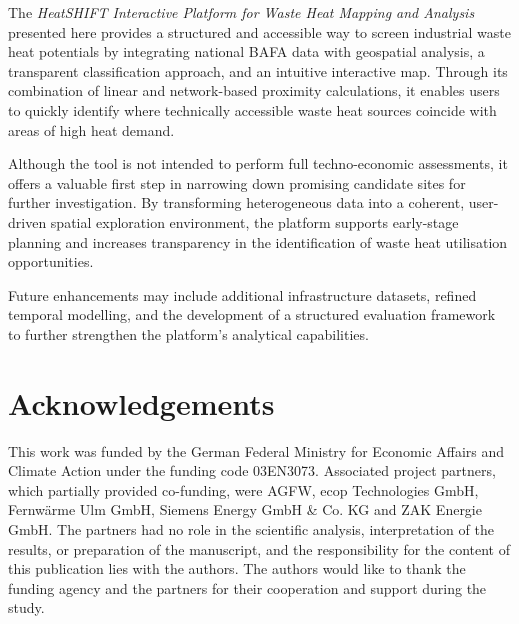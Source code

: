 \documentclass[letterpaper,11pt]{article}
\begin{document}
The \textit{HeatSHIFT Interactive Platform for Waste Heat Mapping and Analysis} presented here provides a structured and accessible way to screen industrial waste heat potentials by integrating national BAFA data with geospatial analysis, a transparent classification approach, and an intuitive interactive map. Through its combination of linear and network-based proximity calculations, it enables users to quickly identify where technically accessible waste heat sources coincide with areas of high heat demand.

Although the tool is not intended to perform full techno-economic assessments, it offers a valuable first step in narrowing down promising candidate sites for further investigation. By transforming heterogeneous data into a coherent, user-driven spatial exploration environment, the platform supports early-stage planning and increases transparency in the identification of waste heat utilisation opportunities.

Future enhancements may include additional infrastructure datasets, refined temporal modelling, and the development of a structured evaluation framework to further strengthen the platform’s analytical capabilities.

\section{Acknowledgements}
This work was funded by the German Federal Ministry for Economic Affairs and Climate Action under the funding code 03EN3073. Associated project partners, which partially provided co-funding, were AGFW, ecop Technologies GmbH, Fernwärme Ulm GmbH, Siemens Energy GmbH \& Co. KG and ZAK Energie GmbH. The partners had no role in the scientific analysis, interpretation of the results, or preparation of the manuscript, and the responsibility for the content of this publication lies with the authors. The authors would like to thank the funding agency and the partners for their cooperation and support during the study.

\vspace{5mm}
\end{document}
